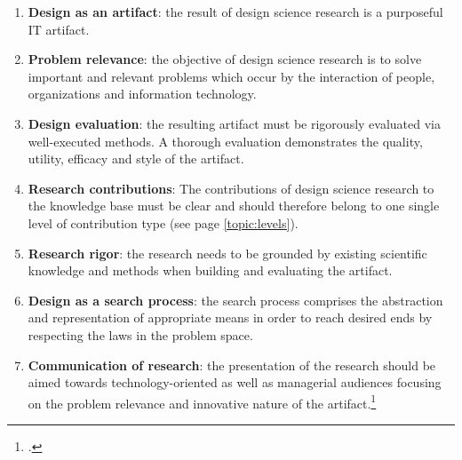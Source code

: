 \begin{enumerate}
    \item \textbf{Design as an artifact}: the result of design science research is a purposeful IT artifact.
    \item \textbf{Problem relevance}: the objective of design science research is to solve important and relevant problems which occur by the interaction of people, organizations and information technology.
    \item \textbf{Design evaluation}: the resulting artifact must be rigorously evaluated via well-executed methods. A thorough evaluation demonstrates the quality, utility, efficacy and style of the artifact.
    \item \textbf{Research contributions}: The contributions of design science research to the knowledge base must be clear and should therefore belong to one single level of contribution type (see page \ref{topic:levels}).
    \item \textbf{Research rigor}: the research needs to be grounded by existing scientific knowledge and methods when building and evaluating the artifact.
    \item \textbf{Design as a search process}: the search process comprises the abstraction and representation of appropriate means in order to reach desired ends by respecting the laws in the problem space.
    \item \textbf{Communication of research}: the presentation of the research should be aimed towards technology-oriented as well as managerial audiences focusing on the problem relevance and innovative nature of the artifact.\footcites[Cf.][p.iv]{ZmudEditorComments1997}[cf.][pp.82 et seq]{HevnerDesignScienceResearch2004}[cf.][p.viii]{WeberEditorCommentsStill2003}
\end{enumerate}


